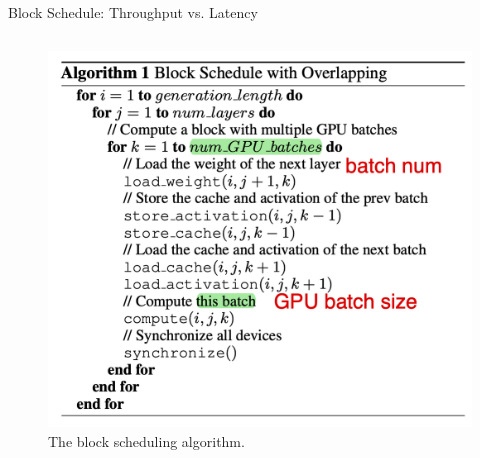 \begin{frame}{Block Schedule: Throughput vs. Latency}
\begin{columns}[c]
        \begin{column}{.5\textwidth}
            \begin{figure}
                \centering
                \includegraphics[width=1.\textwidth]{./images/block-schedule-algorithm.png}
                \caption{The block scheduling algorithm.}
            \end{figure}  
        \end{column}
    \end{columns}  
\end{frame}

